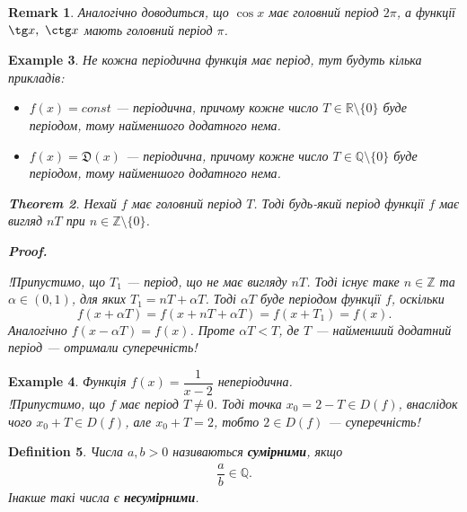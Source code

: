 \documentclass[a4paper, 10pt]{article}
\makeatletter
\def\qed{$\blacksquare$}
\theoremstyle{theoremdd}
\newtheorem{theorem}{Theorem}[subsection]
\theoremstyle{theoremdd}
\newtheorem{definition}[theorem]{Definition}
\theoremstyle{theoremdd}
\theoremstyle{theoremdd}
\newtheorem{example}[theorem]{Example}
\theoremstyle{theoremdd}
\theoremstyle{theoremdd}
\newtheorem{remark}[theorem]{Remark}
\theoremstyle{theoremdd}
\theoremstyle{theoremdd}
\renewenvironment{proof}[1][Proof.\\]{\par
\pushQED{\hfill \qed}%
\normalfont \topsep6\p@\@plus6\p@\relax
\trivlist
\item\relax
{\bfseries
#1\@addpunct{.}}\hspace\labelsep\ignorespaces
}{%
\popQED\endtrivlist\@endpefalse
}
\makeatother
\begin{document}
\begin{remark}
Аналогічно доводиться, що $\cos x$ має головний період $2 \pi$, а функції $\tg x,\ \ctg x$ мають головний період $\pi$.
\end{remark}

\begin{example}
Не кожна періодична функція має період, тут будуть кілька прикладів:
\begin{itemize}
\item $f(x) = const$ --- періодична, причому кожне число $T \in \mathbb{R} \setminus \{0\}$ буде періодом, тому найменшого додатного нема.

\item $f(x) = \mathfrak{D}(x)$ --- періодична, причому кожне число $T \in \mathbb{Q} \setminus \{0\}$ буде періодом, тому найменшого додатного нема.
\end{itemize}

\begin{theorem}
Нехай $f$ має головний період $T$. Тоді будь-який період функції $f$ має вигляд $nT$ при $n \in \mathbb{Z} \setminus \{0\}$.
\end{theorem}

\begin{proof}
!Припустимо, що $T_1$ --- період, що не має вигляду $nT$. Тоді існує таке $n \in \mathbb{Z}$ та $\alpha \in (0,1)$, для яких $T_1 = nT + \alpha T$. Тоді $\alpha T$ буде періодом функції $f$, оскільки
\[
f(x + \alpha T) = f(x + nT + \alpha T) = f(x + T_1) = f(x).
\]
Аналогічно $f(x-\alpha T) = f(x)$. Проте $\alpha T < T$, де $T$ --- найменший додатний період --- отримали суперечність!
\end{proof}
\end{example}

\begin{example}
Функція $f(x) = \dfrac{1}{x-2}$ неперіодична.\\
!Припустимо, що $f$ має період $T \neq 0$. Тоді точка $x_0 = 2-T \in D(f)$, внаслідок чого $x_0+T \in D(f)$, але $x_0+T=2$, тобто $2 \in D(f)$ --- суперечність!
\end{example}

\begin{definition}
Числа $a,b > 0$ називаються \textbf{сумірними}, якщо
\begin{align*}
\dfrac{a}{b} \in \mathbb{Q}.
\end{align*}
Інакше такі числа є \textbf{несумірними}.
\end{definition}
\end{document}
